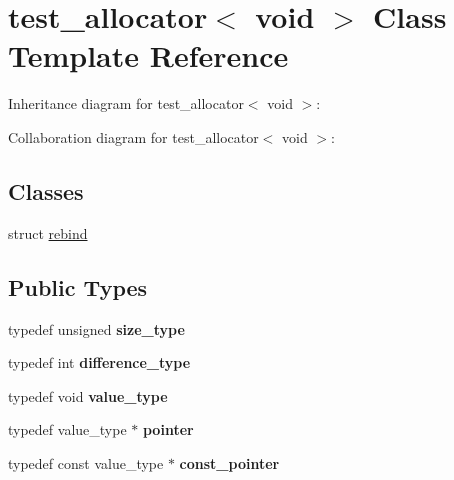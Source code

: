\hypertarget{classtest__allocator_3_01void_01_4}{}\section{test\+\_\+allocator$<$ void $>$ Class Template Reference}
\label{classtest__allocator_3_01void_01_4}


Inheritance diagram for test\+\_\+allocator$<$ void $>$\+:


Collaboration diagram for test\+\_\+allocator$<$ void $>$\+:
\subsection*{Classes}
\begin{DoxyCompactItemize}
\item 
struct \mbox{\hyperlink{structtest__allocator_3_01void_01_4_1_1rebind}{rebind}}
\end{DoxyCompactItemize}
\subsection*{Public Types}
\begin{DoxyCompactItemize}
\item 
\mbox{\label{classtest__allocator_3_01void_01_4_a9b68a424c163f9ded7b17140154ad319}} 
typedef unsigned {\bfseries size\+\_\+type}
\item 
\mbox{\label{classtest__allocator_3_01void_01_4_aff517df4ec15864d1e8161d7517a0cd3}} 
typedef int {\bfseries difference\+\_\+type}
\item 
\mbox{\label{classtest__allocator_3_01void_01_4_aa5e1e1d1900176ed3a2790a243d20cee}} 
typedef void {\bfseries value\+\_\+type}
\item 
\mbox{\label{classtest__allocator_3_01void_01_4_a0a5a66239ab831d55df32a8bb3b1efd6}} 
typedef value\+\_\+type $\ast$ {\bfseries pointer}
\item 
\mbox{\label{classtest__allocator_3_01void_01_4_a7b6326f1d5506db5d048656357656735}} 
typedef const value\+\_\+type $\ast$ {\bfseries const\+\_\+pointer}
\end{DoxyCompactItemize}
